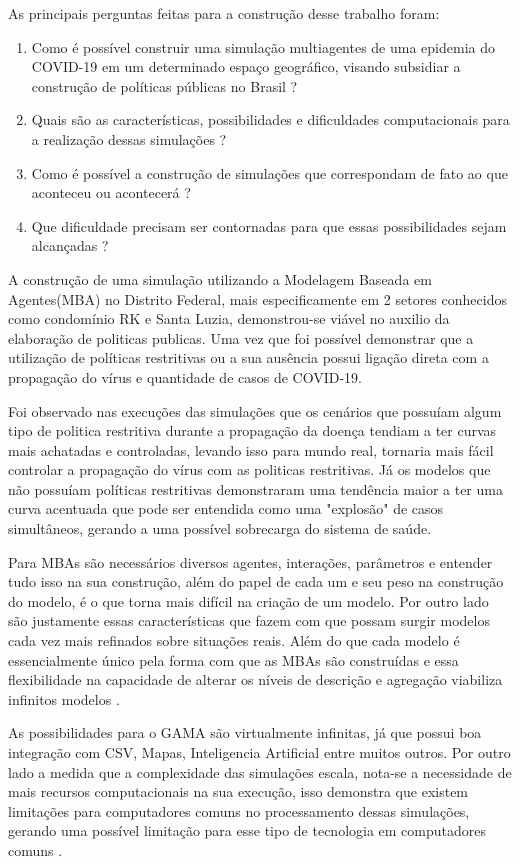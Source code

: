 As principais perguntas feitas para a construção desse trabalho foram:

\begin{enumerate}
\item Como é possível construir uma simulação multiagentes de uma epidemia do COVID-19 em um determinado espaço geográfico, visando subsidiar a construção de políticas públicas no Brasil ? 
\item Quais são as características, possibilidades e dificuldades computacionais para a realização dessas simulações ? 
\item Como é possível a construção de simulações que correspondam de fato ao que aconteceu ou acontecerá ?
\item Que dificuldade precisam ser contornadas para que essas possibilidades sejam alcançadas ?
\end{enumerate}


A construção de uma simulação utilizando a Modelagem Baseada em Agentes(MBA) no Distrito Federal, mais especificamente em 2 setores conhecidos como condomínio RK e Santa Luzia, demonstrou-se viável no auxilio da elaboração de politicas publicas. Uma vez que foi possível demonstrar que a utilização de políticas restritivas ou a sua ausência possui ligação direta com a propagação do vírus e quantidade de casos de COVID-19. 

Foi observado nas execuções das simulações que os cenários que possuíam algum tipo de politica restritiva durante a propagação da doença tendiam a ter curvas mais achatadas e controladas, levando isso para mundo real, tornaria mais fácil controlar a propagação do vírus com as politicas restritivas. Já os modelos que não possuíam políticas restritivas demonstraram uma tendência maior a ter uma curva acentuada que pode ser entendida como uma "explosão" de casos simultâneos, gerando a uma possível sobrecarga do sistema de saúde.    

Para MBAs são necessários diversos agentes, interações, parâmetros e entender tudo isso na sua construção, além do papel de cada um e seu peso na construção do modelo, é o que torna mais difícil na criação de um modelo. Por outro lado são justamente essas características que fazem com que possam surgir modelos cada vez mais refinados sobre situações reais. Além do que cada modelo é essencialmente único pela forma com que as MBAs são construídas e essa flexibilidade na capacidade de alterar os níveis de descrição e agregação viabiliza infinitos modelos \cite{bonabeau2002agent}.

As possibilidades para o GAMA são virtualmente infinitas, já que possui boa integração com CSV, Mapas, Inteligencia Artificial entre muitos outros. Por outro lado a medida que a complexidade das simulações escala, nota-se a necessidade de mais recursos computacionais na sua execução, isso demonstra que existem limitações para computadores comuns no processamento dessas simulações, gerando uma possível limitação para esse tipo de tecnologia em computadores comuns\cite{gamaplataform} .




 





